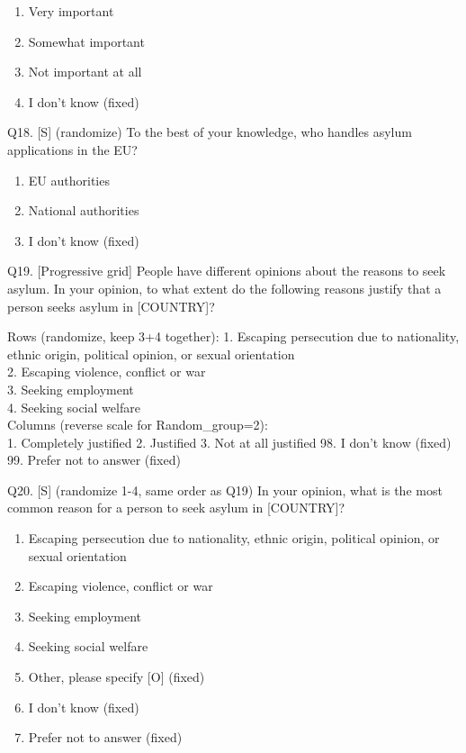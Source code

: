 \documentclass[
  12pt,
  a4paper,
]{article}
\providecommand{\tightlist}{%
  \setlength{\itemsep}{0pt}\setlength{\parskip}{0pt}}
\begin{document}
\begin{enumerate}
\def\labelenumi{\arabic{enumi}.}
\tightlist
\item
  Very important
\item
  Somewhat important
\item
  Not important at all
\item
  I don't know (fixed)
\end{enumerate}

Q18. {[}S{]} (randomize) To the best of your knowledge, who handles asylum applications in the EU?

\begin{enumerate}
\def\labelenumi{\arabic{enumi}.}
\tightlist
\item
  EU authorities
\item
  National authorities\\
\item
  I don't know (fixed)
\end{enumerate}

Q19. {[}Progressive grid{]} People have different opinions about the reasons to seek asylum. In your opinion, to what extent do the following reasons justify that a person seeks asylum in {[}COUNTRY{]}?

Rows (randomize, keep 3+4 together):
1. Escaping persecution due to nationality, ethnic origin, political opinion, or sexual orientation \\
2. Escaping violence, conflict or war \\
3. Seeking employment \\
4. Seeking social welfare \\
Columns (reverse scale for Random\_group=2):\\
1. Completely justified
2. Justified
3. Not at all justified
98. I don't know (fixed)
99. Prefer not to answer (fixed)

Q20. {[}S{]} (randomize 1-4, same order as Q19) In your opinion, what is the most common reason for a person to seek asylum in {[}COUNTRY{]}?

\begin{enumerate}
\def\labelenumi{\arabic{enumi}.}
\tightlist
\item
  Escaping persecution due to nationality, ethnic origin, political opinion, or sexual orientation
\item
  Escaping violence, conflict or war \\
\item
  Seeking employment
\item
  Seeking social welfare
\item
  Other, please specify {[}O{]} (fixed)
\item
  I don't know (fixed)
\item
  Prefer not to answer (fixed)
\end{enumerate}
\end{document}
